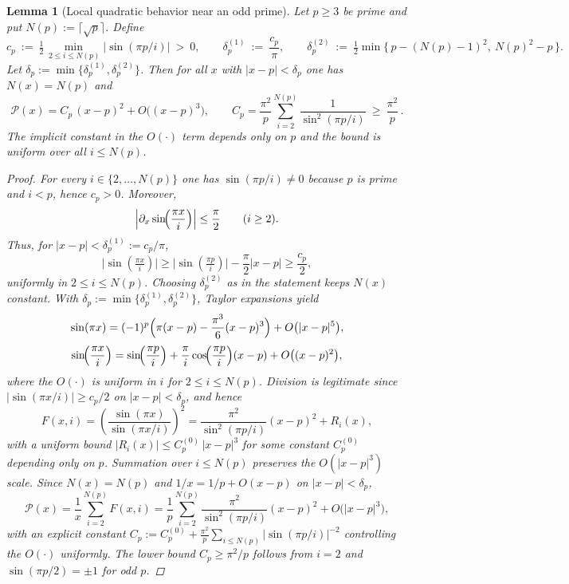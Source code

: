 \documentclass[11pt,a4paper]{amsart}
\theoremstyle{plain}
\newtheorem{lemma}[theorem]{Lemma}
\theoremstyle{definition}
\theoremstyle{remark}
\begin{document}
\begin{lemma}[Local quadratic behavior near an odd prime]\label{lem:local-quadratic}
Let $p\ge 3$ be prime and put $N(p):=\lceil \sqrt{p}\rceil$. Define
\[
c_p\ :=\ \tfrac12\min_{\,2\le i\le N(p)}\bigl|\sin(\pi p/i)\bigr|\ >\ 0,
\qquad
\delta_p^{(1)}\ :=\ \frac{c_p}{\pi},
\qquad
\delta_p^{(2)}\ :=\ \tfrac12\min\bigl\{\,p-(N(p)-1)^2,\ N(p)^2-p\,\bigr\}.
\]
Let $\delta_p:=\min\{\delta_p^{(1)},\delta_p^{(2)}\}$. Then for all $x$ with $|x-p|<\delta_p$ one has $N(x)=N(p)$ and
\[
\mathcal P(x)=C_p\,(x-p)^2+O\bigl((x-p)^3\bigr),
\qquad
C_p=\frac{\pi^2}{p}\sum_{i=2}^{N(p)}\frac{1}{\sin^2(\pi p/i)}\ \ge\ \frac{\pi^2}{p}\,.
\]
The implicit constant in the $O(\cdot)$ term depends only on $p$ and the bound is uniform over all $i\le N(p)$.

\begin{proof}
For every $i\in\{2,\dots,N(p)\}$ one has $\sin(\pi p/i)\neq 0$ because $p$ is prime and $i<p$, hence $c_p>0$. Moreover,
\[
\Bigl|\partial_x \sin\!\Bigl(\frac{\pi x}{i}\Bigr)\Bigr|\le \frac{\pi}{2}\qquad(i\ge 2).
\]
Thus, for $|x-p|<\delta_p^{(1)}:=c_p/\pi$,
\[
\bigl|\sin(\tfrac{\pi x}{i})\bigr|\ge \bigl|\sin(\tfrac{\pi p}{i})\bigr|-\frac{\pi}{2}|x-p|\ge \frac{c_p}{2},
\]
uniformly in $2\le i\le N(p)$. Choosing $\delta_p^{(2)}$ as in the statement keeps $N(x)$ constant. With $\delta_p:=\min\{\delta_p^{(1)},\delta_p^{(2)}\}$, Taylor expansions yield
\[
\sin(\pi x)=(-1)^p\Bigl(\pi(x-p)-\frac{\pi^3}{6}(x-p)^3\Bigr)+O\bigl(|x-p|^5\bigr),
\]
\[
\sin\!\Bigl(\frac{\pi x}{i}\Bigr)=\sin\!\Bigl(\frac{\pi p}{i}\Bigr)+\frac{\pi}{i}\cos\!\Bigl(\frac{\pi p}{i}\Bigr)(x-p)+O\bigl((x-p)^2\bigr),
\]
where the $O(\cdot)$ is uniform in $i$ for $2\le i\le N(p)$. Division is legitimate since $|\sin(\pi x/i)|\ge c_p/2$ on $|x-p|<\delta_p$, and hence
\[
F(x,i)=\left(\frac{\sin(\pi x)}{\sin(\pi x/i)}\right)^{\!2}
=\frac{\pi^2}{\sin^2(\pi p/i)}(x-p)^2+R_i(x),
\]
with a uniform bound $|R_i(x)|\le C_p^{(0)}\,|x-p|^3$ for some constant $C_p^{(0)}$ depending only on $p$. Summation over $i\le N(p)$ preserves the $O(|x-p|^3)$ scale. Since $N(x)=N(p)$ and $1/x=1/p+O(x-p)$ on $|x-p|<\delta_p$,
\[
\mathcal P(x)=\frac{1}{x}\sum_{i=2}^{N(p)}F(x,i)
=\frac{1}{p}\sum_{i=2}^{N(p)}\frac{\pi^2}{\sin^2(\pi p/i)}(x-p)^2+O\bigl(|x-p|^3\bigr),
\]
with an explicit constant $C_p:=C_p^{(0)}+\tfrac{\pi^2}{p}\sum_{i\le N(p)}\bigl|\sin(\pi p/i)\bigr|^{-2}$ controlling the $O(\cdot)$ uniformly. The lower bound $C_p\ge \pi^2/p$ follows from $i=2$ and $\sin(\pi p/2)=\pm 1$ for odd $p$.
\end{proof}
\end{lemma}
\end{document}

